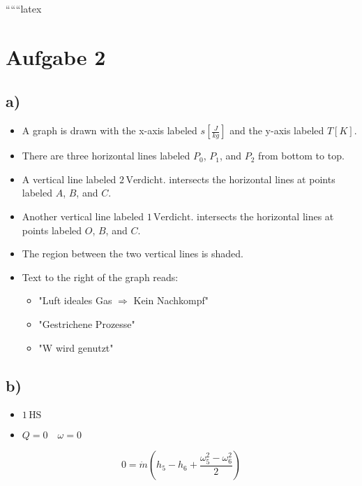 
``````latex


\section*{Aufgabe 2}

\subsection*{a)}

\begin{itemize}
    \item A graph is drawn with the x-axis labeled $s \left[ \frac{J}{kg} \right]$ and the y-axis labeled $T[K]$.
    \item There are three horizontal lines labeled $P_0$, $P_1$, and $P_2$ from bottom to top.
    \item A vertical line labeled $2 \, \text{Verdicht.}$ intersects the horizontal lines at points labeled $A$, $B$, and $C$.
    \item Another vertical line labeled $1 \, \text{Verdicht.}$ intersects the horizontal lines at points labeled $O$, $B$, and $C$.
    \item The region between the two vertical lines is shaded.
\end{itemize}

\begin{itemize}
    \item Text to the right of the graph reads:
    \begin{itemize}
        \item "Luft ideales Gas $\Rightarrow$ Kein Nachkompf"
        \item "Gestrichene Prozesse"
        \item "W wird genutzt"
    \end{itemize}
\end{itemize}

\subsection*{b)}

\begin{itemize}
    \item $1 \, \text{HS}$ \quad {}
    \item {} \quad $Q = 0 \quad \omega = 0$
\end{itemize}

\[
0 = \dot{m} (h_5 - h_6 + \frac{\omega_5^2 - \omega_6^2}{2})
\]

